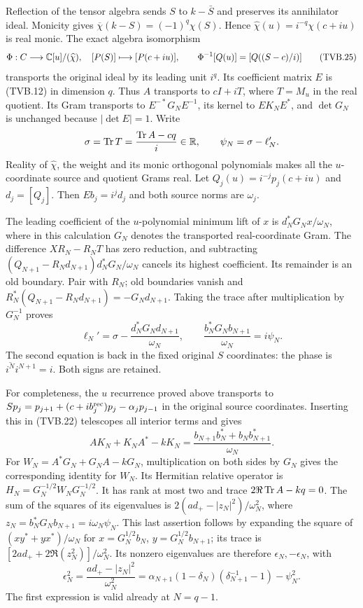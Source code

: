 Reflection of the tensor algebra sends $S$ to $k-\bar S$ and
preserves its annihilator ideal. Monicity gives
$\overline\chi(k-S)=(-1)^q\chi(S)$. Hence
$\widehat\chi(u)=i^{-q}\chi(c+iu)$ is real monic. The exact
algebra isomorphism
\[
 \Phi:C\longrightarrow\mathbb{C}[u]/(\widehat\chi),\quad
 [P(S)]\longmapsto[P(c+iu)],\qquad
 \Phi^{-1}[Q(u)]=[Q((S-c)/i)]
 \tag{TVB.25}
\]
transports the original ideal by its leading unit $i^q$.
Its coefficient matrix $E$ is (TVB.12) in dimension $q$.
Thus $A$ transports to $cI+iT$, where $T=M_u$ in the real
quotient. Its Gram transports to $E^{-*}G_NE^{-1}$,
its kernel to $EK_NE^*$, and $\det G_N$ is unchanged because
$|\det E|=1$. Write
\[
 \sigma=\operatorname{Tr} T=\frac{\operatorname{Tr} A-cq}{i}\in\mathbb{R},
 \qquad\psi_N=\sigma-\ell_N'.
\]
Reality of $\widehat\chi$, the weight and its monic orthogonal
polynomials makes all the $u$-coordinate source and quotient
Grams real. Let $Q_j(u)=i^{-j}p_j(c+iu)$ and $d_j=[Q_j]$.
Then $Eb_j=i^jd_j$ and both source norms are $\omega_j$.

The leading coefficient of the $u$-polynomial minimum lift of
$x$ is $d_N^*G_Nx/\omega_N$, where in this calculation $G_N$
denotes the transported real-coordinate Gram. The difference
$XR_N-R_NT$ has zero reduction, and subtracting
$(Q_{N+1}-R_Nd_{N+1})d_N^*G_N/\omega_N$ cancels its highest
coefficient. Its remainder is an old boundary. Pair with $R_N$;
old boundaries vanish and
$R_N^*(Q_{N+1}-R_Nd_{N+1})=-G_Nd_{N+1}$.
Taking the trace after multiplication by $G_N^{-1}$ proves
\[
 \ell_N'=\sigma-
           \frac{d_N^*G_Nd_{N+1}}{\omega_N},\qquad
 \frac{b_N^*G_Nb_{N+1}}{\omega_N}=i\psi_N.
 \tag{TVB.26}
\]
The second equation is back in the fixed original $S$ coordinates:
the phase is $\overline{i^N}i^{N+1}=i$. Both signs are retained.

For completeness, the $u$ recurrence proved above transports to
$Sp_j=p_{j+1}+(c+ib_j^{\rm rec})p_j
-\alpha_jp_{j-1}$ in the original source coordinates.
Inserting this in (TVB.22) telescopes all interior terms and gives
\[
 AK_N+K_NA^*-kK_N
 =\frac{b_{N+1}b_N^*+b_Nb_{N+1}^*}{\omega_N}.
\]
For $W_N=A^*G_N+G_NA-kG_N$, multiplication on both sides by
$G_N$ gives the corresponding identity for $W_N$.
Its Hermitian relative operator is
$H_N=G_N^{-1/2}W_NG_N^{-1/2}$.
It has rank at most two and trace
$2\Re\operatorname{Tr} A-kq=0$. The sum of the squares of its eigenvalues
is $2(ad_+-|z_N|^2)/\omega_N^2$, where
$z_N=b_N^*G_Nb_{N+1}=i\omega_N\psi_N$.
This last assertion follows by expanding the square of
$(xy^*+yx^*)/\omega_N$ for
$x=G_N^{1/2}b_N$, $y=G_N^{1/2}b_{N+1}$; its trace is
$[2ad_++2\Re(z_N^2)]/\omega_N^2$.
Its nonzero eigenvalues are therefore $\epsilon_N,-\epsilon_N$,
with
\[
 \epsilon_N^2=\frac{ad_+-|z_N|^2}{\omega_N^2}
 =\alpha_{N+1}(1-\delta_N)(\delta_{N+1}^{-1}-1)-\psi_N^2.
 \tag{TVB.27}
\]
The first expression is valid already at $N=q-1$.

